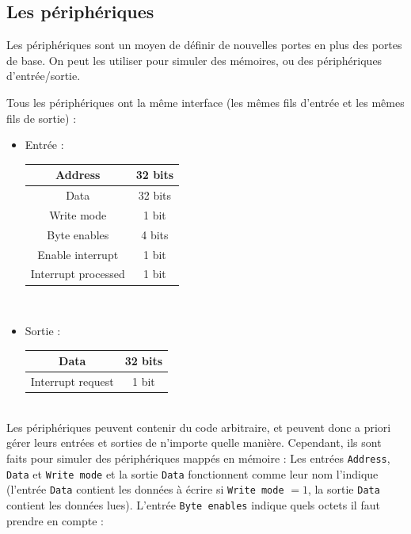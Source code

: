 \documentclass[13pt]{article}
\begin{document}
\subsection{Les périphériques}


Les périphériques sont un moyen de définir de nouvelles portes en plus des
portes de base. On peut les utiliser pour simuler des mémoires, ou des
périphériques d'entrée/sortie.

Tous les périphériques ont la même interface (les mêmes fils d'entrée et
les mêmes fils de sortie) :
\begin{itemize}
\item Entrée :
\text{}\\
\begin{center}
  \begin{tabular}{ | c | c | }
    \hline
    Address &  32 bits \\
    \hline
    Data & 32 bits \\
    \hline
    Write mode & 1 bit\\
    \hline
    Byte enables &  4 bits\\
    \hline
    Enable interrupt & 1 bit\\
    \hline
    Interrupt processed & 1 bit\\
    \hline
  \end{tabular}
\end{center}
\text{}\\
\item Sortie :
\text{}\\
\begin{center}
 \begin{tabular}{ | c | c | }
    \hline
    Data &  32 bits \\
    \hline
    Interrupt request & 1 bit \\
    \hline
  \end{tabular}
\end{center}
\end{itemize}
\text{}\\
Les périphériques peuvent contenir du code arbitraire, et peuvent donc a
priori gérer leurs entrées et sorties de n'importe quelle
manière. Cependant, ils sont faits pour simuler des périphériques mappés en
mémoire : Les entrées \texttt{Address}, \texttt{Data} et \texttt{Write mode} et
la sortie \texttt{Data} 
fonctionnent comme leur nom l'indique (l'entrée \texttt{Data} contient les données
à écrire si \texttt{Write mode} $=  1$, la sortie \texttt{Data} contient les données lues).
L'entrée \texttt{Byte enables} indique quels octets il faut prendre en compte :
\end{document}
